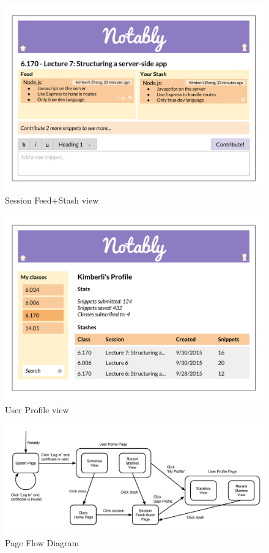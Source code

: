\documentclass{article}
\begin{document}
\begin{figure}[htbp!]
  \caption{Session Feed+Stash view}
  \centering
    \includegraphics[width=6in]{UI1.png}
\end{figure}

\begin{figure}[htbp!]
  \caption{User Profile view}
  \centering
    \includegraphics[width=6in]{UI5.png}
\end{figure}

\begin{figure}[htbp!]
  \caption{Page Flow Diagram}
  \centering
    \includegraphics[width=6in]{PageFlowDiagram.png}
\end{figure}
\end{document}
